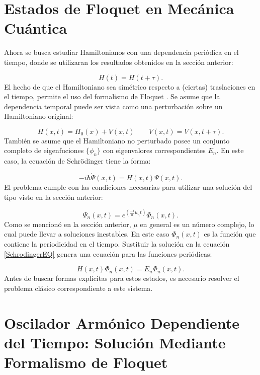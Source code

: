 \documentclass[a4paper,10pt]{report}
\begin{document}
\section{Estados de Floquet en Mecánica Cuántica}

Ahora se busca estudiar Hamiltonianos con una dependencia periódica en el tiempo, donde se utilizaran los resultados obtenidos en la sección anterior:

\begin{equation}
H(t)=H(t+\tau).
\end{equation} El hecho de que el Hamiltoniano sea simétrico respecto a (ciertas) traslaciones en el tiempo, permite el uso del formalismo de Floquet \cite{HanngiDQS}. Se asume que la dependencia temporal puede ser vista como una perturbación sobre un Hamiltoniano original:

\begin{equation}
H(x,t)=H_0(x)+V(x,t) \qquad V(x,t)=V(x,t+\tau).
\end{equation} También se asume que el Hamiltoniano no perturbado posee un conjunto completo de eigenfuciones $\{\phi_n\}$ con eigenvalores correspondientes $E_n$. En este caso, la ecuación de Schr\"{o}dinger tiene la forma:

\begin{equation}\label{SchrodingerEQ}
-i\hbar\dot{\Psi}(x,t) = H(x,t)\Psi(x,t).
\end{equation} El problema cumple con las condiciones necesarias para utilizar una solución del tipo visto en la sección anterior:

\begin{equation}
\Psi_n(x,t) = e^{(\frac{-i}{\hbar}\mu_nt)}\Phi_n(x,t).
\end{equation} Como se mencionó en la sección anterior, $\mu$ en general es un número complejo, lo cual puede llevar a soluciones inestables. En este caso $\Phi_n(x,t)$ es la función que contiene la periodicidad en el tiempo. Sustituir la solución en la ecuación \ref{SchrodingerEQ} genera una ecuación para las funciones periódicas:

\begin{equation}
H(x,t)\Phi_n(x,t)=E_n\Phi_n(x,t).
\end{equation} Antes de buscar formas explícitas para estos estados, es necesario resolver el problema clásico correspondiente a este sistema.

\section{Oscilador Armónico Dependiente del Tiempo: Solución Mediante Formalismo de Floquet}
\end{document}
